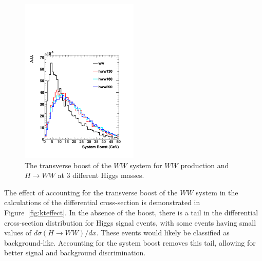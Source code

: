 \documentclass{cmspaper}
\begin{document}
\begin{figure}[!htbp]                                                                                         
\begin{center}                                                                                                
\includegraphics[width=0.5\textwidth]{figures/boost.pdf}                                                      
\caption{The transverse boost of the $WW$ system for $WW$ production and $H \rightarrow WW$ at 3 different Higgs masses.} 
\label{fig:wwboost}                                                                                           
\end{center}                                                                                                  
\end{figure}    

The effect of accounting for the transverse boost of the $WW$ system in the calculations of the differential cross-section
is demonstrated in Figure~\ref{fig:kteffect}. In the absence of the boost, there is a tail in the differential cross-section distribution
for Higgs signal events, with some events having small values of $d\sigma(H \rightarrow WW)/dx$.  
These events would likely be classified as background-like. Accounting for the system boost removes this tail,
allowing for better signal and background discrimination. 
\end{document}
